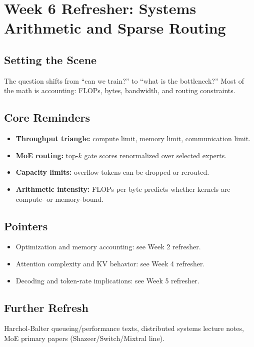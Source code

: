 \section{Week 6 Refresher: Systems Arithmetic and Sparse Routing}

\subsection*{Setting the Scene}
The question shifts from ``can we train?'' to ``what is the bottleneck?'' Most of the math is accounting: FLOPs, bytes, bandwidth, and routing constraints.

\subsection*{Core Reminders}
\begin{itemize}[leftmargin=1.5em]
  \item \textbf{Throughput triangle:} compute limit, memory limit, communication limit.
  \item \textbf{MoE routing:} top-$k$ gate scores renormalized over selected experts.
  \item \textbf{Capacity limits:} overflow tokens can be dropped or rerouted.
  \item \textbf{Arithmetic intensity:} FLOPs per byte predicts whether kernels are compute- or memory-bound.
\end{itemize}

\subsection*{Pointers}
\begin{itemize}[leftmargin=1.5em]
  \item Optimization and memory accounting: see Week 2 refresher.
  \item Attention complexity and KV behavior: see Week 4 refresher.
  \item Decoding and token-rate implications: see Week 5 refresher.
\end{itemize}

\subsection*{Further Refresh}
Harchol-Balter queueing/performance texts, distributed systems lecture notes, MoE primary papers (Shazeer/Switch/Mixtral line).
